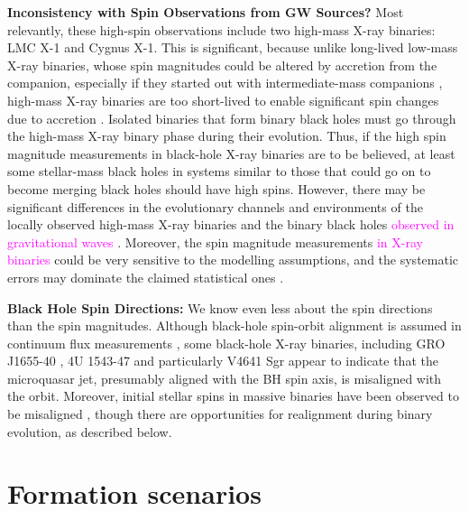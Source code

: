 \documentclass[iop,onecolumn]{revtex4}
\newcommand{\ilya}[1]{\textcolor{magenta}{#1}}
\begin{document}
\textbf{Inconsistency with Spin Observations from GW Sources?} Most relevantly, these high-spin observations include two high-mass X-ray binaries: LMC X-1 and Cygnus X-1.  This is significant, because unlike long-lived low-mass X-ray binaries, whose spin magnitudes could be altered by accretion from the companion, especially if they started out with intermediate-mass companions \citep{Podsiadlowski:2003,Fragos:2015}, high-mass X-ray binaries are too short-lived to enable significant spin changes due to accretion \citep{KingKolb:1999}.  %
Isolated binaries that form binary black holes must go through the high-mass X-ray binary phase during their evolution.  Thus, if the high spin magnitude measurements in black-hole X-ray binaries are to be believed, at least some stellar-mass black holes in systems similar to those that could go on to become merging black holes should have high spins.  However, there may be significant differences in the evolutionary channels and environments of the locally observed high-mass X-ray binaries and the binary black holes \ilya{observed in gravitational waves} \citep{HotokezakaPiran:2017}.  Moreover, the spin magnitude measurements \ilya{in X-ray binaries} could be very sensitive to the modelling assumptions, and the systematic errors may dominate the claimed statistical ones \citep[e.g.,][]{Basak:2017,Kawano:2017}.

\textbf{Black Hole Spin Directions:} We know even less about the spin directions than the spin magnitudes.  Although black-hole spin-orbit alignment is assumed in continuum flux measurements \citep{MillerMiller:2015}, some black-hole X-ray binaries, including GRO J1655-40 \citep{Martin:2008}, 4U 1543-47 \citep{MorningstarMiller:2014} and particularly V4641 Sgr \citep{Orosz:2001,Martin:2008b} appear to indicate that the microquasar jet, presumably aligned with the BH spin axis, is misaligned with the orbit.  Moreover, initial stellar spins in massive binaries have been observed to be misaligned \citep[e.g.,][]{Albrecht:2009,Albrecht:2014}, though there are opportunities for realignment during binary evolution, as described below.

\section{Formation scenarios}\label{form}
\end{document}
